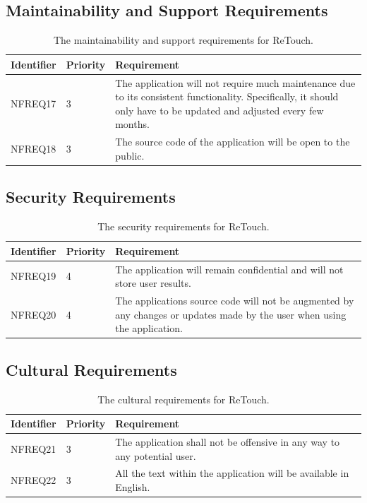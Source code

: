 \documentclass[12pt, titlepage]{article}
\begin{document}
\subsection{Maintainability and Support Requirements}

\begin{table}[H]
  \caption{The maintainability and support requirements for ReTouch.}
\begin{tabular}{ |m{2cm}|m{1.8cm}|m{9.4cm}| }
    \hline
    \textbf{Identifier} & \textbf{Priority} & \textbf{Requirement} \\ 
    \hline
    NFREQ17 & 3 & The application will not require much maintenance due to its consistent functionality. Specifically, it should only have to be updated and adjusted every few months. \\
    \hline
    NFREQ18 & 3 & The source code of the application will be open to the public. \\
    \hline
\end{tabular}
\end{table}

\subsection{Security Requirements}

\begin{table}[H]
  \caption{The security requirements for ReTouch.}
\begin{tabular}{ |m{2cm}|m{1.8cm}|m{9.4cm}| }
    \hline
    \textbf{Identifier} & \textbf{Priority} & \textbf{Requirement} \\ 
    \hline
    NFREQ19 & 4 & The application will remain confidential and will not store user results.\\
    \hline
    NFREQ20 & 4 & The applications source code will not be augmented by any changes or updates made by the user when using the application. \\
    \hline
\end{tabular}
\end{table}

\subsection{Cultural Requirements}

\begin{table}[H]
  \caption{The cultural requirements for ReTouch.}
\begin{tabular}{ |m{2cm}|m{1.8cm}|m{9.4cm}| }
    \hline
    \textbf{Identifier} & \textbf{Priority} & \textbf{Requirement} \\ 
    \hline
    NFREQ21 & 3 & The application shall not be offensive in any way to any potential user.\\
    \hline
    NFREQ22 & 3 & All the text within the application will be available in English. \\
    \hline
\end{tabular}
\end{table}
\end{document}
